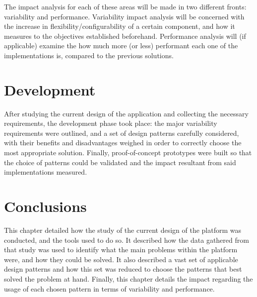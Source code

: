 The impact analysis for each of these areas will be made in two different fronts: variability and performance. Variability impact analysis will be concerned with the increase in flexibility/configurability of a certain component, and how it measures to the objectives established beforehand. Performance analysis will (if applicable) examine the how much more (or less) performant each one of the implementations is, compared to the previous solutions.

\section{Development}\label{sec:development}

After studying the current design of the application and collecting the necessary requirements, the development phase took place: the major variability requirements were outlined, and a set of design patterns carefully considered, with their benefits and disadvantages weighed in order to correctly choose the most appropriate solution. Finally, proof-of-concept prototypes were built so that the choice of patterns could be validated and the impact resultant from said implementations measured.





\section{Conclusions}\label{sec:approach_results_conclusions}

This chapter detailed how the study of the current design of the platform was conducted, and the tools used to do so. It described how the data gathered from that study was used to identify what the main problems within the platform were, and how they could be solved. It also described a vast set of applicable design patterns and how this set was reduced to choose the patterns that best solved the problem at hand. Finally, this chapter details the impact regarding the usage of each chosen pattern in terms of variability and performance.



